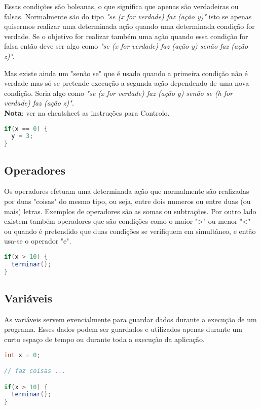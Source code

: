 ﻿\documentclass{article}
\begin{document}
Essas condições são boleanas, o que significa que apenas são verdadeiras ou falsas.
Normalmente são do tipo \textit{"se (x for verdade) faz (ação y)"} isto se apenas quisermos realizar uma determinada ação quando uma determinada condição for verdade. Se o objetivo for realizar também uma ação quando essa condição for falsa então deve ser algo como \textit{"se (x for verdade) faz (ação y) senão faz (ação z)"}.\newline

Mas existe ainda um "senão se" que é usado quando a primeira condição não é verdade mas só se pretende execução a segunda ação dependendo de uma nova condição. Seria algo como \textit{"se (x for verdade) faz (ação y) senão se (h for verdade) faz (ação z)"}. \newline \\
\textbf{Nota}: ver na cheatsheet as instruções para Controlo. \\
\begin{lstlisting}[language=Java]
if(x == 0) {
  y = 3;
}
\end{lstlisting}

\subsection{Operadores}
Os operadores efetuam uma determinada ação que normalmente são realizadas por duas "coisas" do mesmo tipo, ou seja, entre dois numeros ou entre duas (ou mais) letras. Exemplos de operadores são as somas ou subtrações. Por outro lado existem também operadores que são condições como o maior ">" ou menor "<" ou quando é pretendido que duas condições se verifiquem em simultâneo, e então usa-se o operador "e".
\begin{lstlisting}[language=Java]
if(x > 10) {
  terminar();
}
\end{lstlisting}


\subsection{Variáveis}
As variáveis servem exencialmente para guardar dados durante a execução de um programa. Esses dados podem ser guardados e utilizados apenas durante um curto espaço de tempo ou durante toda a execução da aplicação.
\begin{lstlisting}[language=Java]
int x = 0;

// faz coisas ...

if(x > 10) {
  terminar();
}
\end{lstlisting}
\end{document}
